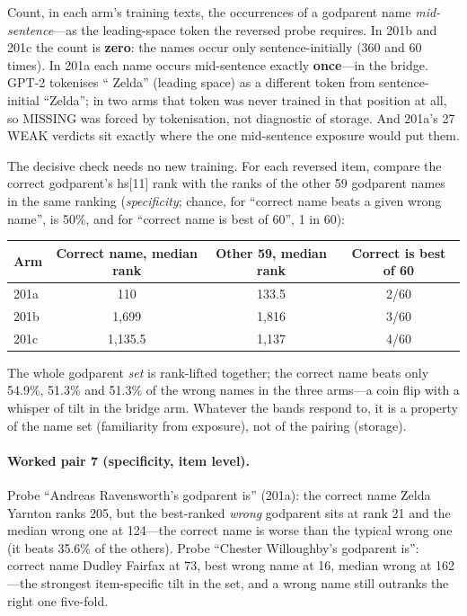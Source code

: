 \documentclass[11pt]{article}
\begin{document}
Count, in each arm's training texts, the occurrences of a godparent
name \emph{mid-sentence}---as the leading-space token the reversed
probe requires. In 201b and 201c the count is \textbf{zero}: the names
occur only sentence-initially (360 and 60 times). In 201a each name
occurs mid-sentence exactly \textbf{once}---in the bridge. GPT-2
tokenises `` Zelda'' (leading space) as a different token from
sentence-initial ``Zelda''; in two arms that token was never trained in
that position at all, so MISSING was forced by tokenisation, not
diagnostic of storage. And 201a's 27 WEAK verdicts sit exactly where
the one mid-sentence exposure would put them.

The decisive check needs no new training. For each reversed item,
compare the correct godparent's hs[11] rank with the ranks of the
other 59 godparent names in the same ranking (\emph{specificity};
chance, for ``correct name beats a given wrong name'', is 50\%, and
for ``correct name is best of 60'', 1 in 60):

\begin{center}
\begin{tabular}{lccc}
\toprule
Arm & Correct name, median rank & Other 59, median rank & Correct is best of 60 \\
\midrule
201a & 110 & 133.5 & 2/60 \\
201b & 1,699 & 1,816 & 3/60 \\
201c & 1,135.5 & 1,137 & 4/60 \\
\bottomrule
\end{tabular}
\end{center}

The whole godparent \emph{set} is rank-lifted together; the correct
name beats only 54.9\%, 51.3\% and 51.3\% of the wrong names in the
three arms---a coin flip with a whisper of tilt in the bridge arm.
Whatever the bands respond to, it is a property of the name set
(familiarity from exposure), not of the pairing (storage).

\paragraph{Worked pair 7 (specificity, item level).}
Probe ``Andreas Ravensworth's godparent is'' (201a): the correct name
Zelda Yarnton ranks 205, but the best-ranked \emph{wrong} godparent
sits at rank 21 and the median wrong one at 124---the correct name is
worse than the typical wrong one (it beats 35.6\% of the others).
Probe ``Chester Willoughby's godparent is'': correct name Dudley
Fairfax at 73, best wrong name at 16, median wrong at 162---the
strongest item-specific tilt in the set, and a wrong name still
outranks the right one five-fold.
\end{document}
